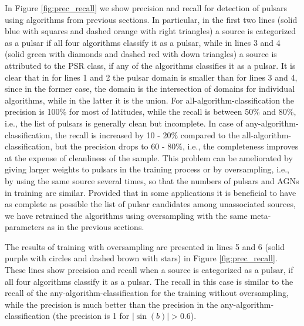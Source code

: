 In Figure \ref{fig:prec_recall} we show precision and recall for detection of pulsars using algorithms from previous sections.
In particular, in the first two lines (solid blue with squares and dashed orange with right triangles) a source is categorized as a pulsar if all four algorithms classify it as a pulsar,
while in lines 3 and 4 (solid green with diamonds and dashed red with down triangles) a source is attributed to the PSR class, if any of the algorithms classifies it as a pulsar.
It is clear that in for lines 1 and 2 the pulsar domain is smaller than for lines 3 and 4, since in the former case, the domain is the intersection of domains for individual algorithms, while in the latter it is the union.
For all-algorithm-classification the precision is 100\% for most of latitudes, while the recall is between 50\% and 80\%, i.e., the list of pulsars is generally clean but incomplete.
In case of any-algorithm-classification, the recall is increased by 10 - 20\% compared to the all-algorithm-classification, but the precision drops to 60 - 80\%, i.e., the completeness improves at the expense of cleanliness of the sample.
This problem can be ameliorated by giving larger weights to pulsars in the training process or by oversampling, i.e., by using the same source several times, so that the numbers of pulsars and AGNs in training are similar.
Provided that in some applications it is beneficial to have as complete as possible the list of pulsar candidates among unassociated sources, we have retrained the algorithms using oversampling with the same meta-parameters as in the previous sections.

The results of training with oversampling are presented in lines 5 and 6 (solid purple with circles and dashed brown with stars) in Figure \ref{fig:prec_recall}. These lines show precision and recall when a source is categorized as a pulsar, if all four algorithms classify it as a pulsar. The recall in this case is similar to the recall of the any-algorithm-classification for the training without oversampling,
while the precision is much better than the precision in the any-algorithm-classification (the precision is 1 for $|\sin(b)| > 0.6$).

